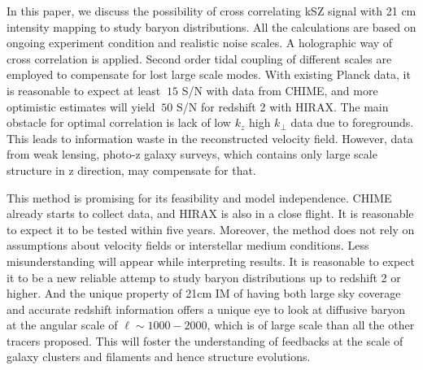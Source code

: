 In this paper, we discuss the possibility of cross correlating kSZ signal with 
21 cm intensity mapping to study baryon distributions. 
All the calculations are based on ongoing experiment condition and realistic noise scales. 
A holographic way of cross correlation is applied. 
Second order tidal coupling of different scales are employed to compensate for 
lost large scale modes. 
With existing Planck data, 
it is reasonable to expect at least $~15$ S/N with data from CHIME, 
and more optimistic estimates will yield $~50$ S/N for redshift 2 with HIRAX. 
The main obstacle for optimal correlation 
is lack of low $k_z$ high $k_\perp$ data due to foregrounds. 
This leads to information waste in the reconstructed velocity field. 
However, data from weak lensing, photo-z galaxy surveys, which 
contains only large scale structure in z direction, may 
compensate for that. 
 
This method is promising for its feasibility and model independence. 
CHIME already starts to collect data, 
and HIRAX is also in a close flight. 
It is reasonable to expect it to be tested within five years. 
Moreover, the method does not rely on assumptions about velocity fields 
or interstellar medium conditions. 
Less misunderstanding will appear while interpreting results. 
It is reasonable to expect it to be a new 
reliable attemp to study baryon distributions up to 
redshift 2 or higher. 
And the unique property of 21cm IM of having both large sky coverage and 
accurate redshift information 
offers a unique eye to look at diffusive baryon 
at the angular scale of $\ell\sim 1000-2000$, 
which is of large scale than all the other tracers 
proposed. 
This will foster the understanding of feedbacks at the scale of 
galaxy clusters and filaments 
and hence structure evolutions.
